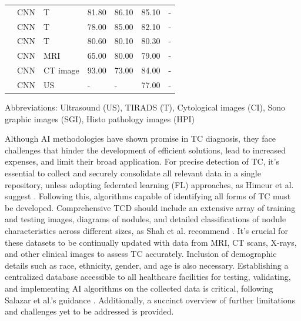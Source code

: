 \documentclass[a4paper,fleqn]{cas-sc}
\begin{document}
\begin{table}[t!]
\begin{tabular}{
m{6mm}
m{30mm}
m{35mm}
m{12mm}
m{12mm}
m{12mm}
m{12mm}
}
\cite{kim2021convolutional} & CNN & T  & 81.80 & 86.10 & 85.10 & - \\
\cite{wu2021deep} & CNN & T  & 78.00 & 85.00 & 82.10 & - \\
\cite{jin2020ultrasound} & CNN & T  & 80.60 & 80.10 & 80.30 & - \\
\cite{wei2021radiomics} & CNN & MRI  & 65.00 & 80.00 & 79.00 & - \\
\cite{gu2019prediction} & CNN & CT image  & 93.00 & 73.00 & 84.00 & - \\
\cite{park2019association} & CNN & US  & - & - & 77.00 & - \\
\hline
\hline
\end{tabular}
\begin{flushleft}
 Abbreviations:  Ultrasound  (US), TIRADS (T), Cytological images (CI), Sono graphic images (SGI), Histo pathology images (HPI)   
\end{flushleft}
\end{table}

Although \ac{AI} methodologies have shown promise in TC diagnosis, they face challenges that hinder the development of efficient solutions, lead to increased expenses, and limit their broad application. For precise detection of TC, it's essential to collect and securely consolidate all relevant data in a single repository, unless adopting federated learning (FL) approaches, as Himeur et al. suggest \cite{himeur2023federated}. Following this, algorithms capable of identifying all forms of TC must be developed. Comprehensive \ac{TCD} should include an extensive array of training and testing images, diagrams of nodules, and detailed classifications of nodule characteristics across different sizes, as Shah et al. recommend \cite{shah2023deep}. It's crucial for these datasets to be continually updated with data from \ac{MRI}, \ac{CT} scans, X-rays, and other clinical images to assess TC accurately. Inclusion of demographic details such as race, ethnicity, gender, and age is also necessary. Establishing a centralized database accessible to all healthcare facilities for testing, validating, and implementing \ac{AI} algorithms on the collected data is critical, following Salazar et al.'s guidance \cite{salazar2019thyroid}. Additionally, a succinct overview of further limitations and challenges yet to be addressed is provided.
\end{document}
